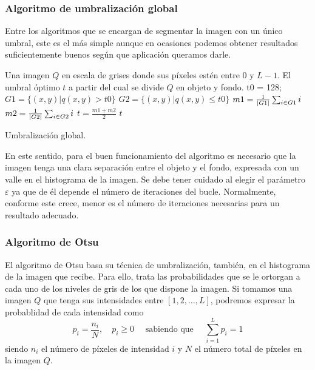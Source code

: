 \subsubsection{Algoritmo de umbralización global}\label{sec:algoritmoglobal}

Entre los algoritmos que se encargan de segmentar la imagen con un único umbral, este es el más simple aunque en ocasiones podemos obtener resultados suficientemente buenos según que aplicación queramos darle.

\begin{algorithm}[!ht]
\begin{algorithmic}[1]
\REQUIRE Una imagen $Q$ en escala de grises donde sus píxeles estén entre $0$ y $L-1$.
\ENSURE El umbral óptimo $t$ a partir del cual se divide $Q$ en objeto y fondo.
\STATE t0 = 128; 
\REPEAT
\STATE $G1 = \{(x, y) | q(x, y) > t0\}$
\STATE $G2 = \{(x, y) | q(x, y) \leq t0\}$
\STATE $m1 = \frac{1}{\left\vert G1\right\vert} \sum_{i\in G1} i$
\STATE $m2 = \frac{1}{\left\vert G2\right\vert} \sum_{i\in G2} i$
\STATE $t = \frac{m1+m2}{2}$
\RETURN $t$
\end{algorithmic}
\caption{Umbralización global.}\label{alg:global}
\end{algorithm}

En este sentido, para el buen funcionamiento del algoritmo es necesario que la imagen tenga una clara separación entre el objeto y el fondo, expresada con un valle en el histograma de la imagen. Se debe tener cuidado al elegir el parámetro $\varepsilon$ ya que de él depende el número de iteraciones del bucle. Normalmente, conforme este crece, menor es el número de iteraciones necesarias para un resultado adecuado.


\subsubsection{Algoritmo de Otsu}\label{sec:algoritmootsu}

El algoritmo de Otsu \cite{art:otsu} basa su técnica de umbralización, también, en el histograma de la imagen que recibe. Para ello, trata las probabilidades que se le ortorgan a cada uno de los niveles de gris de los que dispone la imagen. Si tomamos una imagen $Q$ que tenga sus intensidades entre $[1, 2, \dots, L]$, podremos expresar la probablidad de cada intensidad como
$$p_i = \frac{n_i}{N}, \quad p_i \geq 0\quad\text{ sabiendo que }\quad\sum_{i=1}^{L}p_i=1$$
siendo $n_i$ el número de píxeles de intensidad $i$ y $N$ el número total de píxeles en la imagen $Q$.

